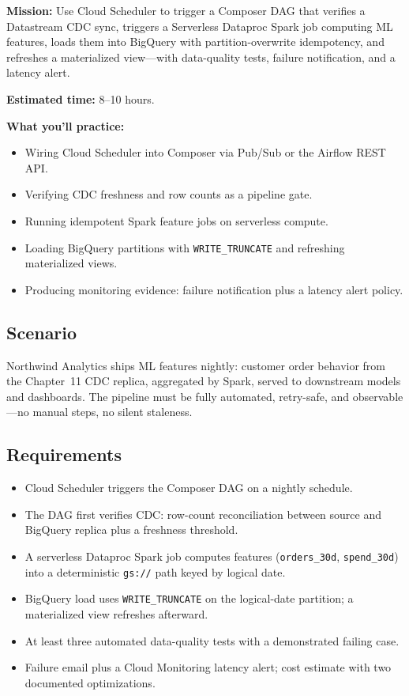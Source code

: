\begin{capstonebox}
\textbf{Mission:} Use Cloud Scheduler to trigger a Composer DAG that verifies a Datastream CDC sync, triggers a Serverless Dataproc Spark job computing ML features, loads them into BigQuery with partition-overwrite idempotency, and refreshes a materialized view---with data-quality tests, failure notification, and a latency alert.

\textbf{Estimated time:} 8--10 hours.

\textbf{What you'll practice:}
\begin{itemize}
    \item Wiring Cloud Scheduler into Composer via Pub/Sub or the Airflow REST API.
    \item Verifying CDC freshness and row counts as a pipeline gate.
    \item Running idempotent Spark feature jobs on serverless compute.
    \item Loading BigQuery partitions with \texttt{WRITE\_TRUNCATE} and refreshing materialized views.
    \item Producing monitoring evidence: failure notification plus a latency alert policy.
\end{itemize}
\end{capstonebox}

\subsection*{Scenario}
Northwind Analytics ships ML features nightly: customer order behavior from the Chapter~11 CDC replica, aggregated by Spark, served to downstream models and dashboards. The pipeline must be fully automated, retry-safe, and observable---no manual steps, no silent staleness.

\subsection*{Requirements}
\begin{itemize}
    \item Cloud Scheduler triggers the Composer DAG on a nightly schedule.
    \item The DAG first verifies CDC: row-count reconciliation between source and BigQuery replica plus a freshness threshold.
    \item A serverless Dataproc Spark job computes features (\texttt{orders\_30d}, \texttt{spend\_30d}) into a deterministic \texttt{gs://} path keyed by logical date.
    \item BigQuery load uses \texttt{WRITE\_TRUNCATE} on the logical-date partition; a materialized view refreshes afterward.
    \item At least three automated data-quality tests with a demonstrated failing case.
    \item Failure email plus a Cloud Monitoring latency alert; cost estimate with two documented optimizations.
\end{itemize}

